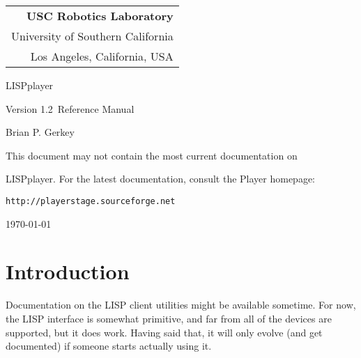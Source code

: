 \documentclass[11pt]{article}
\def\VERSION {1.2}
\def\HOMEPAGE {{\tt http://playerstage.sourceforge.net}}
\begin{document}
\setcounter{page}{0}

\titlepage

\begin{flushright}
\begin{tabular}{r}
{\bf USC Robotics Laboratory}\\
University of Southern California\\
Los Angeles, California, USA\\
\end{tabular}
\end{flushright}

\vspace{5cm}
\centerline{\huge{LISPplayer}}
\vspace{0.5cm}
\centerline{\large{Version \VERSION\ Reference Manual}}
\vspace{2cm}

\centerline{\large Brian P. Gerkey}
\vspace{1cm}

\centerline{This document may not contain the most current documentation on}
\centerline{LISPplayer.  For the latest documentation, consult the Player 
homepage:}
\centerline{\HOMEPAGE}

\vspace{4cm}

\centerline{\today}

\newpage

\setcounter{page}{0}
\section{Introduction}
Documentation on the LISP client utilities might be available sometime.
For now, the LISP interface is somewhat primitive, and far from all of
the devices are supported, but it does work.  Having said that, it will
only evolve (and get documented) if someone starts actually using it.
\end{document}
